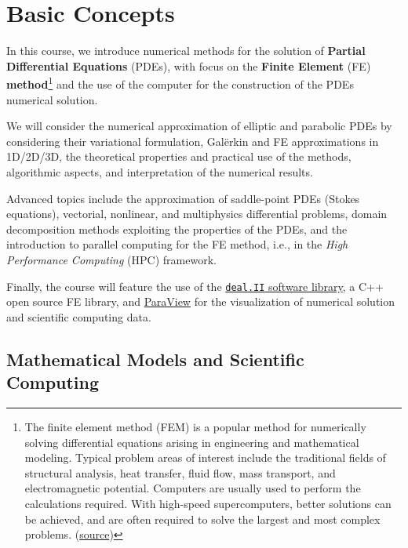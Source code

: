 \section{Basic Concepts}

In this course, we introduce numerical methods for the solution of \textbf{Partial Differential Equations} (PDEs), with focus on the \textbf{Finite Element} (FE) \textbf{method}\footnote{The finite element method (FEM) is a popular method for numerically solving differential equations arising in engineering and mathematical modeling. Typical problem areas of interest include the traditional fields of structural analysis, heat transfer, fluid flow, mass transport, and electromagnetic potential. Computers are usually used to perform the calculations required. With high-speed supercomputers, better solutions can be achieved, and are often required to solve the largest and most complex problems. (\href{https://en.wikipedia.org/wiki/Finite_element_method}{source})} and the use of the computer for the construction of the PDEs numerical solution.

\highspace
We will consider the numerical approximation of elliptic and parabolic PDEs by considering their variational formulation, Galërkin and FE approximations in 1D/2D/3D, the theoretical properties and practical use of the methods, algorithmic aspects, and interpretation of the numerical results.

\highspace
Advanced topics include the approximation of saddle-point PDEs (Stokes equations), vectorial, nonlinear, and multiphysics differential problems, domain decomposition methods exploiting the properties of the PDEs, and the introduction to parallel computing for the FE method, i.e., in the \emph{High Performance Computing} (HPC) framework.

\highspace
Finally, the course will feature the use of the \href{https://www.dealii.org/}{\texttt{deal.II} software library}, a C++ open source FE library, and \href{https://www.paraview.org/}{ParaView} for the visualization of numerical solution and scientific computing data.

\newpage

\subsection{Mathematical Models and Scientific Computing}

